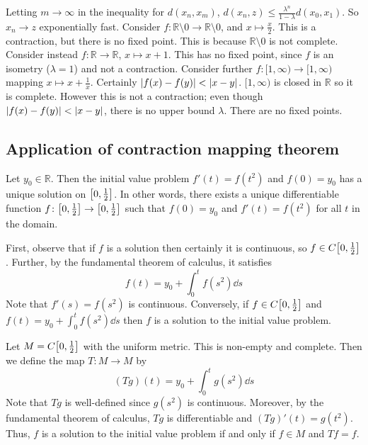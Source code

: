 \begin{remark}
	Letting \( m \to \infty \) in the inequality for \( d(x_n, x_m) \), \( d(x_n, z) \leq \frac{\lambda^n}{1-\lambda} d(x_0, x_1) \).
	So \( x_n \to z \) exponentially fast.
	Consider \( f \colon \mathbb R \setminus \qty{0} \to \mathbb R \setminus \qty{0} \), and \( x \mapsto \frac{x}{2} \).
	This is a contraction, but there is no fixed point.
	This is because \( \mathbb R \setminus \qty{0} \) is not complete.
	Consider instead \( f \colon \mathbb R \to \mathbb R \), \( x \mapsto x + 1 \).
	This has no fixed point, since \( f \) is an isometry (\( \lambda = 1 \)) and not a contraction.
	Consider further \( f \colon [1,\infty) \to [1,\infty) \) mapping \( x \mapsto x + \frac{1}{x} \).
	Certainly \( \abs{f(x) - f(y)} < \abs{x-y} \).
	\( [1,\infty) \) is closed in \( \mathbb R \) so it is complete.
	However this is not a contraction; even though \( \abs{f(x) - f(y)} < \abs{x-y} \), there is no upper bound \( \lambda \).
	There are no fixed points.
\end{remark}

\subsection{Application of contraction mapping theorem}
Let \( y_0 \in \mathbb R \).
Then the initial value problem \( f'(t) = f(t^2) \) and \( f(0) = y_0 \) has a unique solution on \( \qty[0, \frac{1}{2}] \).
In other words, there exists a unique differentiable function \( f \colon \qty[0, \frac{1}{2}] \to \qty[0, \frac{1}{2}] \) such that \( f(0) = y_0 \) and \( f'(t) = f(t^2) \) for all \( t \) in the domain.

First, observe that if \( f \) is a solution then certainly it is continuous, so \( f \in C\qty[0, \frac{1}{2}] \).
Further, by the fundamental theorem of calculus, it satisfies
\[
	f(t) = y_0 + \int_0^t f(s^2) \dd{s}
\]
Note that \( f'(s) = f(s^2) \) is continuous.
Conversely, if \( f \in C\qty[0, \frac{1}{2}] \) and \( f(t) = y_0 + \int_0^t f(s^2) \dd{s} \) then \( f \) is a solution to the initial value problem.

Let \( M = C\qty[0,\frac{1}{2}] \) with the uniform metric.
This is non-empty and complete.
Then we define the map \( T \colon M \to M \) by
\[
	(Tg)(t) = y_0 + \int_0^t g(s^2) \dd{s}
\]
Note that \( Tg \) is well-defined since \( g(s^2) \) is continuous.
Moreover, by the fundamental theorem of calculus, \( Tg \) is differentiable and \( (Tg)'(t) = g(t^2) \).
Thus, \( f \) is a solution to the initial value problem if and only if \( f \in M \) and \( Tf = f \).

